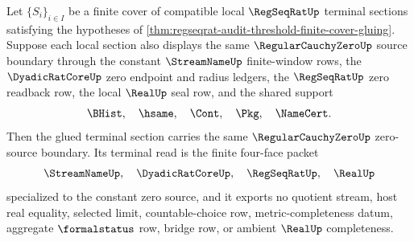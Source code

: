 \begin{theorem}
\label{thm:regseqrat-zero-source-finite-cover-gluing}
Let $\{S_i\}_{i \in I}$ be a finite cover of compatible local $\RegSeqRatUp$ terminal sections satisfying the hypotheses of \autoref{thm:regseqrat-audit-threshold-finite-cover-gluing}. Suppose each local section also displays the same $\RegularCauchyZeroUp$ source boundary through the constant $\StreamNameUp$ finite-window rows, the $\DyadicRatCoreUp$ zero endpoint and radius ledgers, the $\RegSeqRatUp$ zero readback row, the local $\RealUp$ seal row, and the shared support
$$
\BHist,\quad \hsame,\quad \Cont,\quad \Pkg,\quad \NameCert.
$$
Then the glued terminal section carries the same $\RegularCauchyZeroUp$ zero-source boundary. Its terminal read is the finite four-face packet
$$
\StreamNameUp,\quad \DyadicRatCoreUp,\quad \RegSeqRatUp,\quad \RealUp
$$
specialized to the constant zero source, and it exports no quotient stream, host real equality, selected limit, countable-choice row, metric-completeness datum, aggregate $\formalstatus$ row, bridge row, or ambient $\RealUp$ completeness.
\end{theorem}
